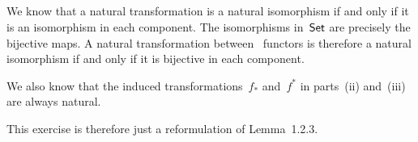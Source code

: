 \subsection{}

We know that a natural transformation is a natural isomorphism if and only if it is an isomorphism in each component.
The isomorphisms in~$\mathsf{Set}$ are precisely the bijective maps.
A natural transformation between~ functors is therefore a natural isomorphism if and only if it is bijective in each component.

We also know that the induced transformations~$f_*$ and~$f^*$ in parts~(ii) and~(iii) are always natural.

This exercise is therefore just a reformulation of Lemma~1.2.3.
